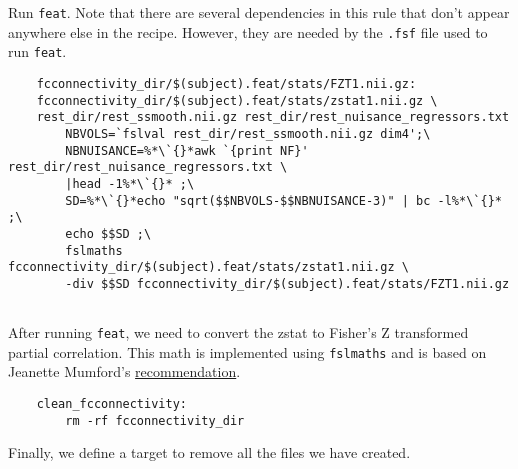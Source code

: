 Run \texttt{feat}. Note that there are several dependencies in this
rule that don't appear anywhere else in the recipe. However, they are
needed by the \texttt{.fsf} file used to run \texttt{feat}.

\begin{lstlisting}
	fcconnectivity_dir/$(subject).feat/stats/FZT1.nii.gz: 
	fcconnectivity_dir/$(subject).feat/stats/zstat1.nii.gz \
	rest_dir/rest_ssmooth.nii.gz rest_dir/rest_nuisance_regressors.txt 
		NBVOLS=`fslval rest_dir/rest_ssmooth.nii.gz dim4';\
		NBNUISANCE=%*\`{}*awk `{print NF}' rest_dir/rest_nuisance_regressors.txt \
		|head -1%*\`{}* ;\
		SD=%*\`{}*echo "sqrt($$NBVOLS-$$NBNUISANCE-3)" | bc -l%*\`{}* ;\
		echo $$SD ;\
		fslmaths fcconnectivity_dir/$(subject).feat/stats/zstat1.nii.gz \
		-div $$SD fcconnectivity_dir/$(subject).feat/stats/FZT1.nii.gz 
		
\end{lstlisting}

After running \texttt{feat}, we need to convert the zstat to Fisher's
Z transformed partial correlation. This math is implemented using
\texttt{fslmaths} and is based on Jeanette Mumford's \href{http://mumfordbrainstats.tumblr.com/post/125523326931/how-to-convert-zstat-images-to-fishers-z}{recommendation}.  

\begin{lstlisting}
	clean_fcconnectivity:
		rm -rf fcconnectivity_dir
\end{lstlisting}

Finally, we define a target to remove all the files we have created.

